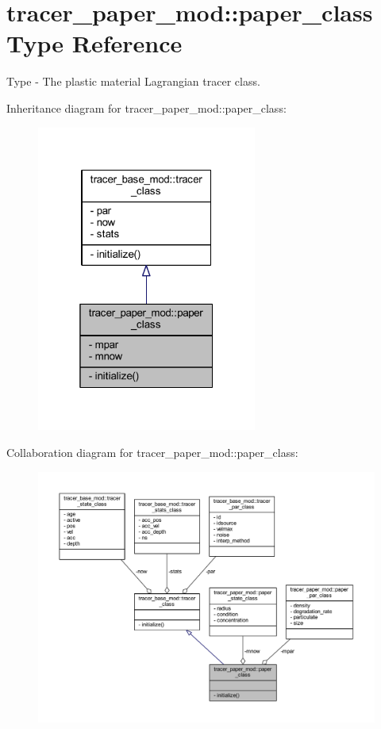 \hypertarget{structtracer__paper__mod_1_1paper__class}{}\section{tracer\+\_\+paper\+\_\+mod\+:\+:paper\+\_\+class Type Reference}
\label{structtracer__paper__mod_1_1paper__class}


Type -\/ The plastic material Lagrangian tracer class.  




Inheritance diagram for tracer\+\_\+paper\+\_\+mod\+:\+:paper\+\_\+class\+:\nopagebreak
\begin{figure}[H]
\begin{center}
\leavevmode
\includegraphics[width=205pt]{structtracer__paper__mod_1_1paper__class__inherit__graph}
\end{center}
\end{figure}


Collaboration diagram for tracer\+\_\+paper\+\_\+mod\+:\+:paper\+\_\+class\+:\nopagebreak
\begin{figure}[H]
\begin{center}
\leavevmode
\includegraphics[width=350pt]{structtracer__paper__mod_1_1paper__class__coll__graph}
\end{center}
\end{figure}
